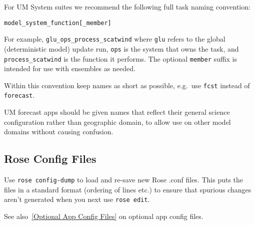 For UM System suites we recommend the following full task naming convention:

\lstset{language=suiterc}
\begin{lstlisting}
model_system_function[_member]
\end{lstlisting}

For example, \lstinline=glu_ops_process_scatwind= where \lstinline=glu= refers
to the global (deterministic model) update run, \lstinline=ops= is the system
that owns the task, and \lstinline=process_scatwind= is the function it
performs. The optional \lstinline=member= suffix is intended for use with
ensembles as needed.

Within this convention keep names as short as possible, e.g.\ use
\lstinline=fcst= instead of \lstinline=forecast=.

UM forecast apps should be given names that reflect their general science
configuration rather than geographic domain, to allow use on other model
domains without causing confusion.

\subsection{Rose Config Files}

Use \lstinline=rose config-dump= to load and re-save new Rose .conf files. This
puts the files in a standard format (ordering of lines etc.) to ensure that
spurious changes aren't generated when you next use \lstinline=rose edit=.

See also~\ref{Optional App Config Files} on optional app config files.
